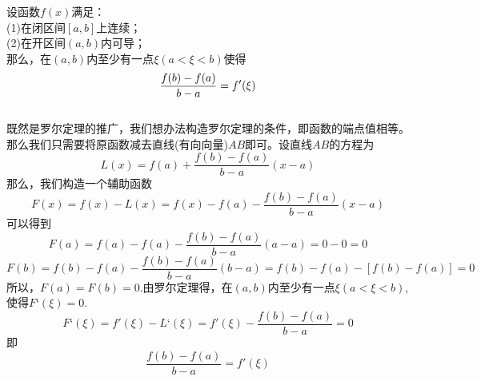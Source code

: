 \noindent 设函数$f(x)$满足：
\\ \kg(1)\enspace 在闭区间$[a,b]$上连续；\\
\kg (2)\enspace 在开区间$(a,b)$内可导；\\
那么，在$(a,b)$内至少有一点$\xi(a<\xi<b)$使得
\begin{equation}
	\frac{f(b)-f(a)}{b-a}=f'(\xi)\sj
\end{equation}
\\ \proof 既然是罗尔定理的推广，我们想办法构造罗尔定理的条件，即函数的端点值相等。那么我们只需要将原函数减去直线(有向向量)$AB$即可。设直线$AB$的方程为
\begin{equation}
	\nonumber
	L(x)=f(a)+\frac{f(b)-f(a)}{b-a}(x-a)
\end{equation}
那么，我们构造一个辅助函数
\begin{equation}
	\nonumber
	F(x)=f(x)-L(x)=f(x)-f(a)-\frac{f(b)-f(a)}{b-a}(x-a)
\end{equation}
可以得到
\begin{equation}
\nonumber
	F(a)=f(a)-f(a)-\frac{f(b)-f(a)}{b-a}(a-a)=0-0=0
\end{equation}
\begin{equation}
	\nonumber
	F(b)=f(b)-f(a)-\frac{f(b)-f(a)}{b-a}(b-a)=f(b)-f(a)-[f(b)-f(a)]=0
\end{equation}
所以，$F(a)=F(b)=0$.由罗尔定理得，在$(a,b)$内至少有一点$\xi(a<\xi<b)$,使得$F‘(\xi)=0$.
\begin{equation}
	\nonumber
	F‘(\xi)=f'(\xi)-L‘(\xi)=f'(\xi)-\frac{f(b)-f(a)}{b-a}=0
\end{equation}
即\begin{equation}
	\nonumber
	\frac{f(b)-f(a)}{b-a}=f'(\xi)
\end{equation}
\